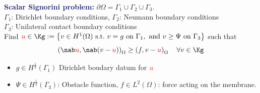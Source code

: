 \documentclass[aspectratio=169]{beamer}
\begin{document}
\begin{frame}
  \textcolor{midnightblue}{\textbf{Scalar Signorini problem:}}
  $\partial \Omega = \Gamma_1 \cup \Gamma_2 \cup \Gamma_3$. \\
  $\Gamma_1$: Dirichlet boundary conditions, $\Gamma_2$: Neumann boundary conditions \\
  $\Gamma_3$: Unilateral contact boundary conditions
  \\
  \vspace*{0.1 cm}
  Find $\textcolor{red}{u} \in \Kg := \left\{ v \in H^1(\Omega) \ \text{s.t.} \ v=g \ \text{on} \ \Gamma_1, \ \text{and} \ v \geq \Psi \ \text{on} \ \Gamma_3 \right\}$ such that
\begin{equation*}
\left( \nab \textcolor{red}{u}, \nab (v-\textcolor{red}{u}) \right)_{\Omega} \geq \left(f,v-\textcolor{red}{u}\right)_{\Omega} \quad \forall v \in \Kg
\end{equation*}
\vspace*{-0.5 cm}
\begin{itemize}
\item $g \in H^{\frac{1}{2}}(\Gamma_1)$ Dirichlet boudary datum for $\textcolor{red}{u}$
  \item  $\Psi \in H^{\frac{1}{2}}(\Gamma_3)$: Obstacle function, $f \in L^2(\Omega)$: force acting on the membrane.
\end{itemize}
\vspace*{0.1 cm}
 \end{frame}
\end{document}
